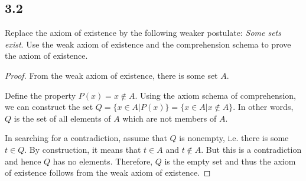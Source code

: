 \subsection*{3.2}

Replace the axiom of existence by the following weaker postulate: \textit{Some sets exist}. Use the weak axiom of existence and the comprehension schema to prove the axiom of existence.

\begin{proof}
From the weak axiom of existence, there is some set $A$.

Define the property $P(x) = x \notin A$. Using the axiom schema of comprehension, we can construct the set $Q = \{x \in A | P(x)\} = \{x \in A | x \notin A\}$. In other words, $Q$ is the set of all elements of $A$ which are not members of $A$.

In searching for a contradiction, assume that $Q$ is nonempty, i.e. there is some $t \in Q$. By construction, it means that $t \in A$ and $t \notin A$. But this is a contradiction and hence $Q$ has no elements. Therefore, $Q$ is the empty set and thus the axiom of existence follows from the weak axiom of existence.
\end{proof}

